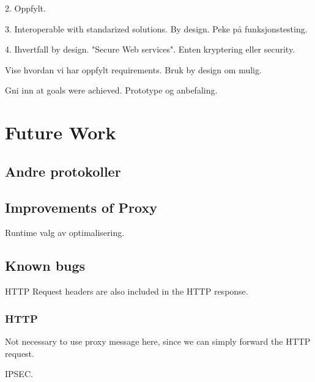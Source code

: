 \documentclass[USenglish]{ifimaster}
\begin{document}
2. Oppfylt.

3. Interoperable with standarized solutions. By design. Peke på funksjonstesting.

4. Ihvertfall by design. "Secure Web services". Enten kryptering eller security.

Vise hvordan vi har oppfylt requirements.
Bruk by design om mulig.

Gni inn at goals were achieved. Prototype og anbefaling.


\section{Future Work}

\subsection{Andre protokoller}

\subsection{Improvements of Proxy}

Runtime valg av optimalisering.

\subsection{Known bugs}

HTTP Request headers are also included in the HTTP response.

\subsubsection{HTTP}

Not necessary to use proxy message here, since we can simply forward the HTTP request.

IPSEC.

\pagebreak
\printbibliography{}
\printglossaries{}


\end{document}
